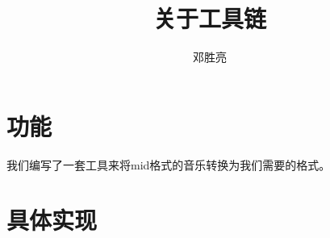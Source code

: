 \documentclass{article}
\title{关于工具链}
\author{邓胜亮}
\begin{document}
  \section{功能}
    我们编写了一套工具来将mid格式的音乐转换为我们需要的格式。
  \section{具体实现}
\end{document}
